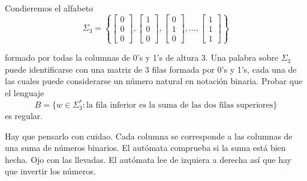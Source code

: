 \documentclass[twoside]{article}
\begin{document}
\begin{ejercicio}{8}
Condieremos el alfabeto
$$\Sigma_3 = \left\{\begin{bmatrix}
0\\
0\\
0
\end{bmatrix},\begin{bmatrix}
1\\
0\\
0
\end{bmatrix},\begin{bmatrix}
0\\
1\\
0
\end{bmatrix},\dots,\begin{bmatrix}
1\\
1\\
1
\end{bmatrix}\right\}$$

formado por todas la columnas de 0's y 1's de altura 3. Una palabra sobre $\Sigma_3$ puede identificarse
con una matriz de 3 filas formada por 0's y 1's, cada una de las cuales puede considerarse un
número natural en notación binaria. Probar que el lenguaje
$$B = \{w \in \Sigma^*_3: \text{la fila inferior es la suma de las dos filas superiores}\}$$
es regular.
\end{ejercicio}
\begin{solucion}
Hay que pensarlo con cuidao. Cada columna se corresponde a las columnas de una suma de números binarios. El autómata comprueba si la suma está bien hecha. Ojo con las llevadas. El autómata lee de izquiera a derecha así que hay que invertir los números. 
\end{solucion}
\newpage
\end{document}
